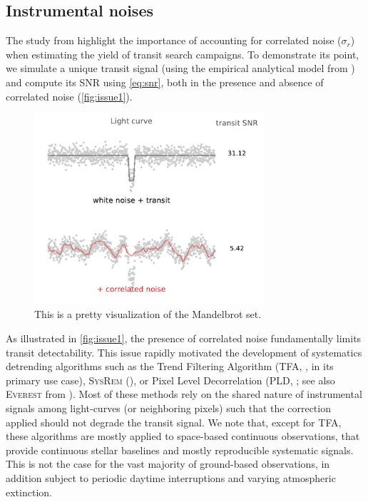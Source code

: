 \documentclass{aastex631}
\begin{document}
\subsection{Instrumental noises}

The study from \citealt{pont2006} highlight the importance of accounting for correlated noise ($\sigma_r$) when estimating the yield of transit search campaigns. To demonstrate its point, we simulate a unique transit signal (using the empirical analytical model from \citealt{protopapas}) and compute its SNR using \autoref{eq:snr}, both in the presence and absence of correlated noise (\autoref{fig:issue1}).

\begin{figure}[H]
    \begin{centering}
        \includegraphics[width=8.5cm]{../figures/first_issue.pdf}
        \caption{This is a pretty visualization of the Mandelbrot set.}
        \label{fig:issue1}
    \end{centering}
\end{figure}

As illustrated in \autoref{fig:issue1}, the presence of correlated noise fundamentally limits transit detectability. This issue rapidly motivated the development of systematics detrending algorithms such as the Trend Filtering Algorithm (\textsc{TFA}, \citealt{tfa}, in its primary use case), \textsc{SysRem} (\citealt{sysrem}), or Pixel Level Decorrelation (\textsc{PLD}, \citealt{pld}; see also \textsc{Everest} from \citealt{everest1, everest2}). Most of these methods rely on the shared nature of instrumental signals among light-curves (or neighboring pixels) such that the correction applied should not degrade the transit signal. We note that, except for \textsc{TFA}, these algorithms are mostly applied to space-based continuous observations, that provide continuous stellar baselines and mostly reproducible systematic signals. This is not the case for the vast majority of ground-based observations, in addition subject to periodic daytime interruptions and varying atmospheric extinction.
\end{document}
